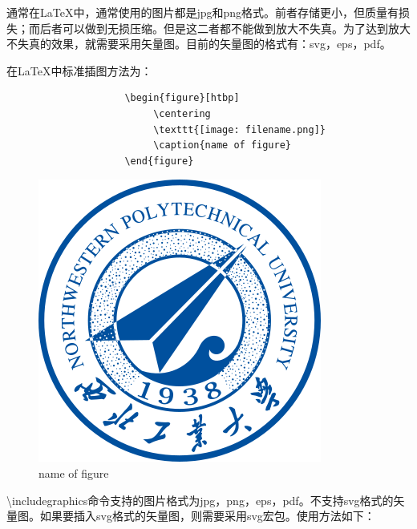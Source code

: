 \documentclass[12pt]{book}
\begin{document}
通常在\LaTeX{}中，通常使用的图片都是jpg和png格式。前者存储更小，但质量有损失；而后者可以做到无损压缩。但是这二者都不能做到放大不失真。为了达到放大不失真的效果，就需要采用矢量图。目前的矢量图的格式有：svg，eps，pdf。

在\LaTeX{}中标准插图方法为：
\begin{figure}[htbp]
     \begin{minipage}{0.45\textwidth}
          \begin{verbatim}
               \begin{figure}[htbp]
                    \centering
                    \texttt{[image: filename.png]}
                    \caption{name of figure}
               \end{figure}
          \end{verbatim}
     \end{minipage}
     \begin{minipage}{0.45\textwidth}
          \centering
          \includegraphics[scale=0.2]{logo.png}
          \caption{name of figure}
     \end{minipage}
\end{figure}

\textbackslash includegraphics命令支持的图片格式为jpg，png，eps，pdf。不支持svg格式的矢量图。如果要插入svg格式的矢量图，则需要采用svg宏包。使用方法如下：
\end{document}
